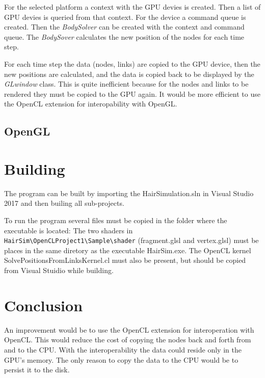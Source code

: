 \documentclass[11pt,a4paper]{scrartcl}
\begin{document}
For the selected platform a context with the GPU devies is created. Then a list of GPU devies is queried from that context. For the device a command queue is created. Then the \textit{BodySolver} can be created with the context and command queue. The \textit{BodySover} calculates the new position of the nodes for each time step.

For each time step the data (nodes, links) are copied to the GPU device, then the new positions are calculated, and the data is copied back to be displayed by the \textit{GLwindow} class. This is quite inefficient because for the nodes and links to be rendered they must be copied to the GPU again. It would be more efficient to use the OpenCL extension for interopability with OpenGL.

\subsection{OpenGL}


\section{Building}
The program can be built by importing the HairSimulation.sln in Visual Studio 2017 and then builing all sub-projects.

To run the program several files must be copied in the folder where the executable is located: The two shaders in \verb|HairSim\OpenCLProject1\Sample\shader| (fragment.glsl and vertex.glsl) must be places in the same diretory as the executable HairSim.exe. The OpenCL kernel SolvePositionsFromLinksKernel.cl must also be present, but should be copied from Visual Stuidio while building.


\section{Conclusion}


An improvement would be to use the OpenCL extension for interoperation with OpenCL. This would reduce the cost of copying the nodes back and forth from and to the CPU. With the interoperability the data could reside only in the GPU's memory. The only reason to copy the data to the CPU would be to persist it to the disk.
\end{document}
